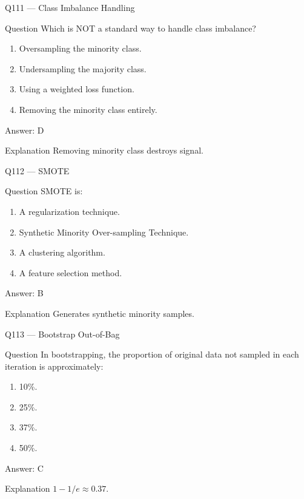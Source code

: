 \documentclass[aspectratio=169,8pt]{beamer}
\begin{document}
	\begin{frame}{Q111 --- Class Imbalance Handling}
		\begin{block}{Question}
			Which is NOT a standard way to handle class imbalance?
		\end{block}
		\begin{enumerate}
			\item Oversampling the minority class.
			\item Undersampling the majority class.
			\item Using a weighted loss function.
			\item Removing the minority class entirely.
		\end{enumerate}
		\begin{exampleblock}{Answer: D}\end{exampleblock}
		\begin{block}{Explanation}
			Removing minority class destroys signal.
		\end{block}
	\end{frame}
	
	\begin{frame}{Q112 --- SMOTE}
		\begin{block}{Question}
			SMOTE is:
		\end{block}
		\begin{enumerate}
			\item A regularization technique.
			\item Synthetic Minority Over-sampling Technique.
			\item A clustering algorithm.
			\item A feature selection method.
		\end{enumerate}
		\begin{exampleblock}{Answer: B}\end{exampleblock}
		\begin{block}{Explanation}
			Generates synthetic minority samples.
		\end{block}
	\end{frame}
	
	\begin{frame}{Q113 --- Bootstrap Out-of-Bag}
		\begin{block}{Question}
			In bootstrapping, the proportion of original data not sampled in each iteration is approximately:
		\end{block}
		\begin{enumerate}
			\item 10\%.
			\item 25\%.
			\item 37\%.
			\item 50\%.
		\end{enumerate}
		\begin{exampleblock}{Answer: C}\end{exampleblock}
		\begin{block}{Explanation}
			$1 - 1/e \approx 0.37$.
		\end{block}
	\end{frame}
	
\end{document}
